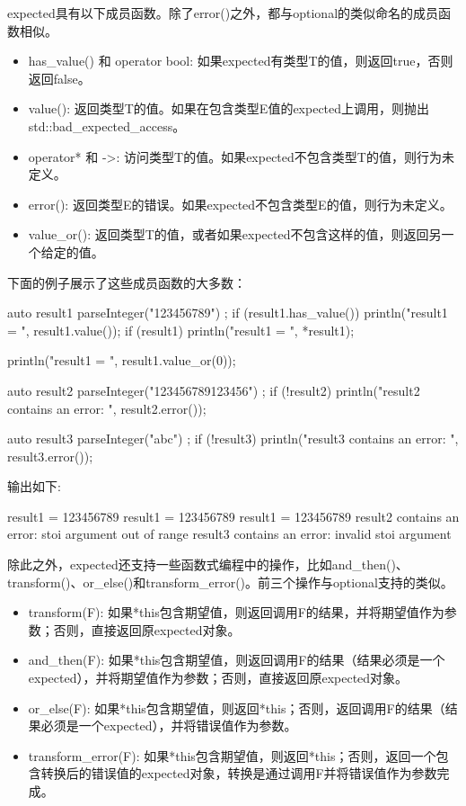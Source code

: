 expected具有以下成员函数。除了error()之外，都与optional的类似命名的成员函数相似。

\begin{itemize}
\item
has\_value() 和 operator bool: 如果expected有类型T的值，则返回true，否则返回false。

\item
value(): 返回类型T的值。如果在包含类型E值的expected上调用，则抛出std::bad\_expected\_access。

\item
operator* 和 ->: 访问类型T的值。如果expected不包含类型T的值，则行为未定义。

\item
error(): 返回类型E的错误。如果expected不包含类型E的值，则行为未定义。

\item
value\_or(): 返回类型T的值，或者如果expected不包含这样的值，则返回另一个给定的值。
\end{itemize}

下面的例子展示了这些成员函数的大多数：

\begin{cpp}
auto result1 { parseInteger("123456789") };
if (result1.has_value()) { println("result1 = {}", result1.value()); }
if (result1) { println("result1 = {}", *result1); }

println("result1 = {}", result1.value_or(0));

auto result2 { parseInteger("123456789123456") };
if (!result2) { println("result2 contains an error: {}", result2.error()); }

auto result3 { parseInteger("abc") };
if (!result3) { println("result3 contains an error: {}", result3.error()); }
\end{cpp}

输出如下:

\begin{shell}
result1 = 123456789
result1 = 123456789
result1 = 123456789
result2 contains an error: stoi argument out of range
result3 contains an error: invalid stoi argument
\end{shell}

除此之外，expected还支持一些函数式编程中的操作，比如and\_then()、transform()、or\_else()和transform\_error()。前三个操作与optional支持的类似。

\begin{itemize}
\item
transform(F): 如果*this包含期望值，则返回调用F的结果，并将期望值作为参数；否则，直接返回原expected对象。

\item
and\_then(F): 如果*this包含期望值，则返回调用F的结果（结果必须是一个expected），并将期望值作为参数；否则，直接返回原expected对象。

\item
or\_else(F): 如果*this包含期望值，则返回*this；否则，返回调用F的结果（结果必须是一个expected），并将错误值作为参数。

\item
transform\_error(F): 如果*this包含期望值，则返回*this；否则，返回一个包含转换后的错误值的expected对象，转换是通过调用F并将错误值作为参数完成。
\end{itemize}

